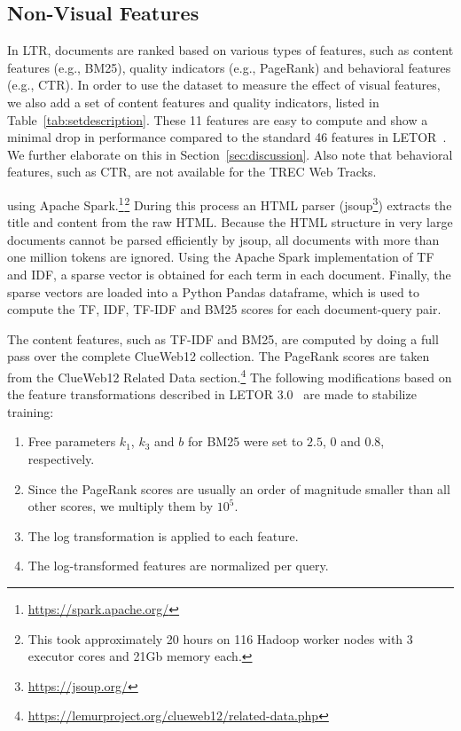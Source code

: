 \subsection{Non-Visual Features} 
\label{sec:contentfeature}
In LTR, documents are ranked based on various types of features, such as content features (e.g., BM25), quality indicators (e.g., PageRank) and behavioral features (e.g., CTR).
In order to use the \datasetname{} dataset to measure the effect of visual features, we also add a set of content features and quality indicators,
listed in Table~\ref{tab:setdescription}.
These 11 features are easy to compute and show a minimal drop in performance compared to the standard 46 features in LETOR~\cite{qin2010letor}.
We further elaborate on this in Section~\ref{sec:discussion}.
Also note that behavioral features, such as CTR, are not available for the TREC Web Tracks.

 using Apache Spark.\footnote{\url{https://spark.apache.org/}}$^{ }$\footnote{This took approximately 20 hours on 116 Hadoop worker nodes with 3 executor cores and 21Gb memory each.}
During this process an HTML parser (jsoup\footnote{\url{https://jsoup.org/}}) extracts the title and content from the raw HTML.
Because the HTML structure in very large documents cannot be parsed efficiently by jsoup, all documents with more than one million tokens are ignored.
Using the Apache Spark implementation of TF and IDF, a sparse vector is obtained for each term in each document. Finally, the sparse vectors are loaded into a Python Pandas dataframe, which is used to compute the TF, IDF, TF-IDF and BM25 scores for each document-query pair.
\fi

The content features, such as TF-IDF and BM25, are computed by doing a full pass over the complete ClueWeb12 collection.
The PageRank scores are taken from the ClueWeb12 Related Data section.\footnote{\url{https://lemurproject.org/clueweb12/related-data.php}}
The following modifications based on the feature transformations described in LETOR 3.0~\cite{qin2010letor} are made to stabilize training:
\begin{enumerate}[leftmargin=14pt]
\item Free parameters $k_1$, $k_3$ and $b$ for BM25 were set to $2.5$, $0$ and $0.8$, respectively. 
\item Since the PageRank scores are usually an order of magnitude smaller than all other scores, we multiply them by $10^5$.
\item The log transformation is applied to each feature.
\item The log-transformed features are normalized per query.  
\end{enumerate}

